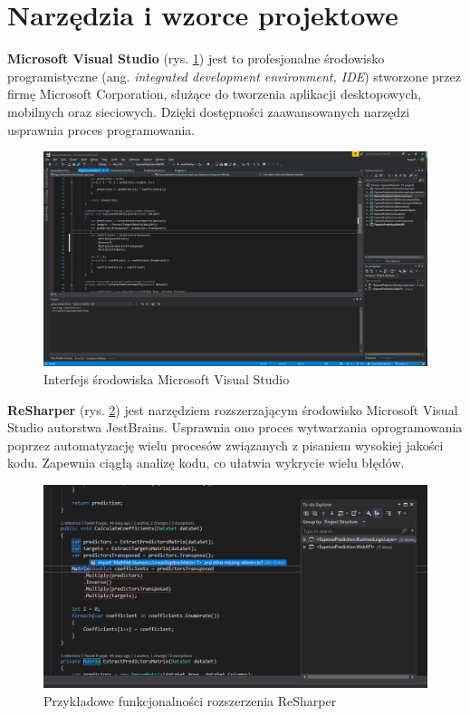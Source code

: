 \section{Narzędzia i wzorce projektowe}
\textbf{Microsoft Visual Studio} (rys. \ref{vs_interfejs}) jest to profesjonalne środowisko programistyczne (ang. \textit{integrated development environment, IDE}) stworzone przez firmę Microsoft Corporation, służące do tworzenia aplikacji desktopowych, mobilnych oraz sieciowych. Dzięki dostępności zaawansowanych narzędzi usprawnia proces programowania.\cite{visualstudio}
\begin{figure}[!ht]
	\begin{center}
		\includegraphics[width=6in]{img/aplikacje/vs_interfejs.png}
		\caption{Interfejs środowiska Microsoft Visual Studio}
		\label{vs_interfejs}
	\end{center}
\end{figure}

\textbf{ReSharper} (rys. \ref{resharper_interfejs}) jest narzędziem rozszerzającym środowisko Microsoft Visual Studio autorstwa JestBrains. Usprawnia ono proces wytwarzania oprogramowania poprzez automatyzację wielu procesów związanych z pisaniem wysokiej jakości kodu. Zapewnia ciągłą analizę kodu, co ułatwia wykrycie wielu błędów.\cite{resharper}
\begin{figure}[!ht]
	\begin{center}
		\includegraphics[width=6in]{img/aplikacje/resharper_interfejs.png}
		\caption{Przykładowe funkcjonalności rozszerzenia ReSharper}
		\label{resharper_interfejs}
	\end{center}
\end{figure}

